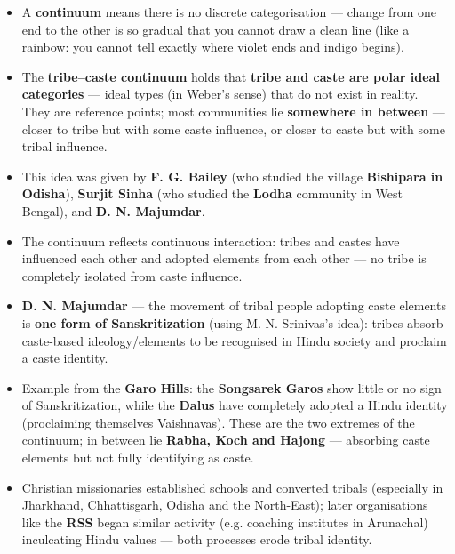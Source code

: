 \begin{KeyConcept}
\begin{itemize}
\item A \textbf{continuum} means there is no discrete categorisation --- change from one end to the other is so gradual that you cannot draw a clean line (like a rainbow: you cannot tell exactly where violet ends and indigo begins).
\item The \textbf{tribe--caste continuum} holds that \textbf{tribe and caste are polar ideal categories} --- ideal types (in Weber's sense) that do not exist in reality. They are reference points; most communities lie \textbf{somewhere in between} --- closer to tribe but with some caste influence, or closer to caste but with some tribal influence.
\item This idea was given by \textbf{F. G. Bailey} (who studied the village \textbf{Bishipara in Odisha}), \textbf{Surjit Sinha} (who studied the \textbf{Lodha} community in West Bengal), and \textbf{D. N. Majumdar}.
\item The continuum reflects continuous interaction: tribes and castes have influenced each other and adopted elements from each other --- no tribe is completely isolated from caste influence.
\end{itemize}
\end{KeyConcept}

\begin{ExampleBox}
\begin{itemize}
\item \textbf{D. N. Majumdar} --- the movement of tribal people adopting caste elements is \textbf{one form of Sanskritization} (using M. N. Srinivas's idea): tribes absorb caste-based ideology/elements to be recognised in Hindu society and proclaim a caste identity.
\item Example from the \textbf{Garo Hills}: the \textbf{Songsarek Garos} show little or no sign of Sanskritization, while the \textbf{Dalus} have completely adopted a Hindu identity (proclaiming themselves Vaishnavas). These are the two extremes of the continuum; in between lie \textbf{Rabha, Koch and Hajong} --- absorbing caste elements but not fully identifying as caste.
\item Christian missionaries established schools and converted tribals (especially in Jharkhand, Chhattisgarh, Odisha and the North-East); later organisations like the \textbf{RSS} began similar activity (e.g. coaching institutes in Arunachal) inculcating Hindu values --- both processes erode tribal identity.
\end{itemize}
\end{ExampleBox}

